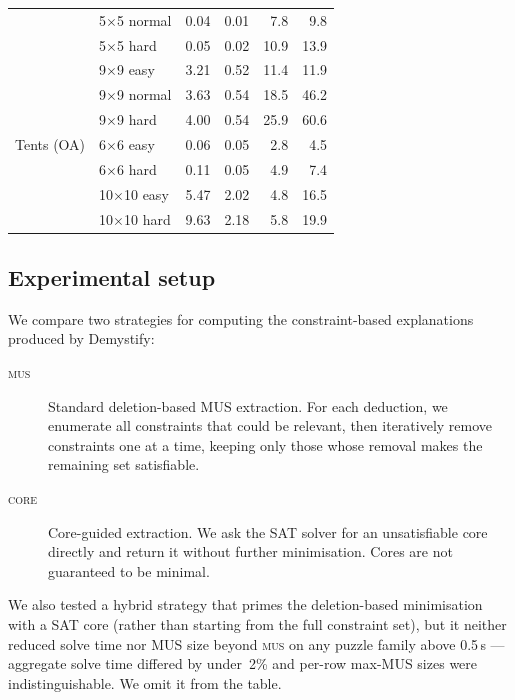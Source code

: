 \begin{table}[t]
\begin{tabular}{@{}ll rr rr@{}}
  & 5$\times$5 normal  & 0.04 & 0.01  &  7.8 &  9.8 \\
  & 5$\times$5 hard    & 0.05 & 0.02  & 10.9 & 13.9 \\
  & 9$\times$9 easy    & 3.21 & 0.52  & 11.4 & 11.9 \\
  & 9$\times$9 normal  & 3.63 & 0.54  & 18.5 & 46.2 \\
  & 9$\times$9 hard    & 4.00 & 0.54  & 25.9 & 60.6 \\
\addlinespace
Tents (OA)
  & 6$\times$6 easy    & 0.06 & 0.05  &  2.8 &  4.5 \\
  & 6$\times$6 hard    & 0.11 & 0.05  &  4.9 &  7.4 \\
  & 10$\times$10 easy  & 5.47 & 2.02  &  4.8 &16.5  \\
  & 10$\times$10 hard  & 9.63 & 2.18  &  5.8 &19.9  \\
\bottomrule
\end{tabular}
\end{table}



\subsection{Experimental setup}

We compare two strategies for computing the constraint-based
explanations produced by Demystify:

\begin{description}
\item[\textsc{mus}] Standard deletion-based MUS extraction.  For each
  deduction, we enumerate all constraints that could be relevant, then
  iteratively remove constraints one at a time, keeping only those
  whose removal makes the remaining set satisfiable.

\item[\textsc{core}] Core-guided extraction.  We ask the SAT solver
  for an unsatisfiable core directly and return it without further
  minimisation.  Cores are not guaranteed to be minimal.
\end{description}

We also tested a hybrid strategy that primes the deletion-based
minimisation with a SAT core (rather than starting from the full
constraint set), but it neither reduced solve time nor MUS size
beyond \textsc{mus} on any puzzle family above 0.5\,s --- aggregate
solve time differed by under~2\% and per-row max-MUS sizes were
indistinguishable.  We omit it from the table.

